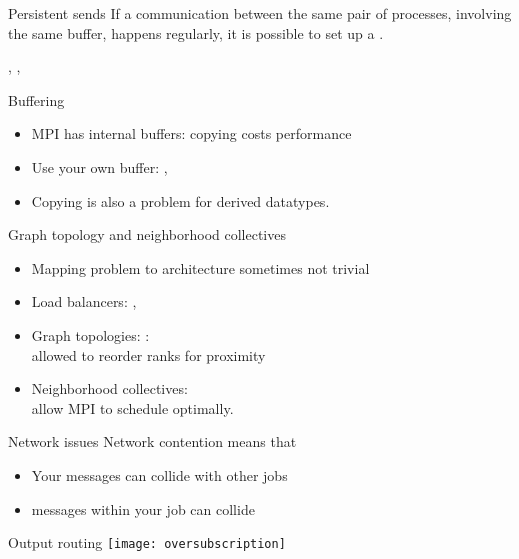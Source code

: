 \begin{frame}[containsverbatim]{Persistent sends}
  If a communication between the same pair of processes, involving the
  same buffer, happens regularly, it is possible to set up a
  .

  , , 
\end{frame}

\begin{frame}[containsverbatim]{Buffering}

  \begin{itemize}
  \item MPI has internal buffers: copying costs performance
  \item Use your own buffer: , 
  \item Copying is also a problem for derived datatypes.
  \end{itemize}
\end{frame}

\begin{frame}[containsverbatim]{Graph topology and neighborhood collectives}
  \begin{itemize}
  \item Mapping problem to architecture sometimes not trivial
  \item Load balancers: , 
  \item Graph topologies: :\\
    allowed to reorder ranks for proximity
  \item Neighborhood collectives: \\
    allow MPI to schedule optimally.
  \end{itemize}
\end{frame}

\begin{frame}[containsverbatim]{Network issues}
  Network contention means that
  \begin{itemize}
  \item Your messages can collide with other jobs
  \item messages within your job can collide
  \end{itemize}
\end{frame}

\begin{frame}{Output routing}
  \texttt{[image: oversubscription]}
\end{frame}

